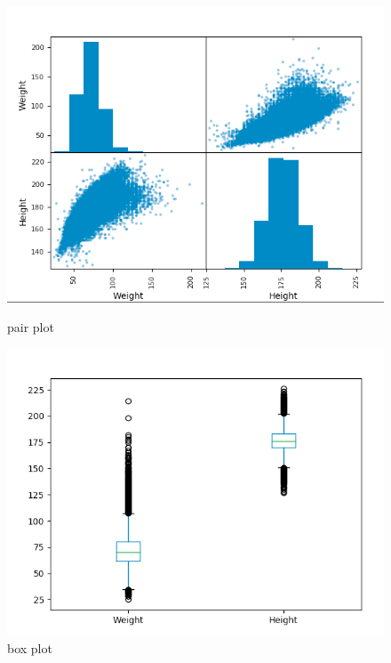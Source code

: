 \begin{figure}[h!]
  \begin{minipage}[l]{0.49\linewidth}
    \includegraphics[scale=0.39]{assets/ex06_pair_plot.png}
    \caption{pair plot}
  \end{minipage}
  \hfill
  \begin{minipage}[c]{0.49\linewidth}
    \includegraphics[scale=0.39]{assets/ex06_box_plot.png}
    \caption{box plot}
  \end{minipage}  
\end{figure}